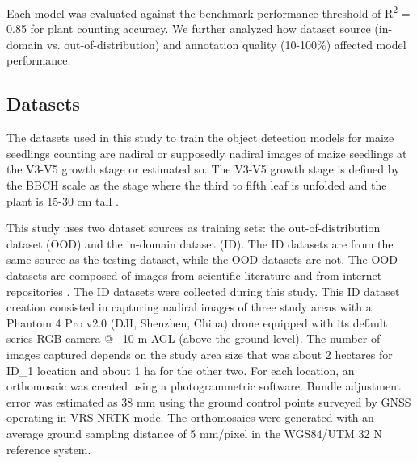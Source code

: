 \documentclass{article}
\begin{document}
Each model was evaluated against the benchmark performance threshold of R\textsuperscript{2} = 0.85 for plant counting accuracy. We further analyzed how dataset source (in-domain vs. out-of-distribution) and annotation quality (10-100\%) affected model performance.

\subsection{Datasets}
The datasets used in this study to train the object detection models for maize seedlings
counting are nadiral or supposedly nadiral images of maize seedlings at the V3-V5 growth stage
or estimated so.
The V3-V5 growth stage is defined by the BBCH scale as the stage where the third to fifth
leaf is unfolded and the plant is 15-30 cm tall \cite{meierBBCHSystemCoding2009}.

This study uses two dataset sources as training sets: the out-of-distribution dataset (OOD)
and the in-domain dataset (ID). The ID datasets are from the same source as the
testing dataset, while the OOD datasets are not.
The OOD datasets are composed of images from scientific literature \cite{liuEstimatingMaizeSeedling2022,davidPlantDetectionCounting2021}
and from internet repositories \cite{Maize_seedingDatasetOverview,MaizeseedlingdetectionDatasetOverview}.
The ID datasets were collected during this study. This ID dataset creation consisted in
capturing nadiral images of three study areas with a Phantom 4 Pro v2.0 (DJI, Shenzhen, China)
drone equipped with its default series RGB camera @ ~10 m AGL (above the ground level).
The number of images captured depends on the study area size that was about 2 hectares
for ID\_1 location and about 1 ha for the other two.
For each location, an orthomosaic was created using a photogrammetric software.
Bundle adjustment error was estimated as 38 mm using the ground control points
surveyed by GNSS operating in VRS-NRTK mode. The orthomosaics were generated with an 
average ground sampling distance of 5 mm/pixel in the WGS84/UTM 32 N reference system.
\end{document}
